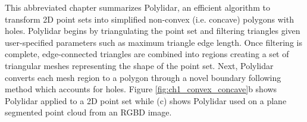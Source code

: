 


This abbreviated chapter summarizes Polylidar, an efficient algorithm to transform 2D point sets into simplified non-convex (i.e. concave) polygons with holes. Polylidar begins by triangulating the point set and filtering triangles given user-specified parameters such as maximum triangle edge length. Once filtering is complete, edge-connected triangles are combined into regions creating a set of triangular meshes representing the shape of the point set. Next, Polylidar converts each mesh region to a polygon through a novel boundary following method which accounts for holes. Figure \ref{fig:ch1_convex_concave}b shows Polylidar applied to a 2D point set while (c) shows Polylidar used on a plane segmented point cloud from an RGBD image.


